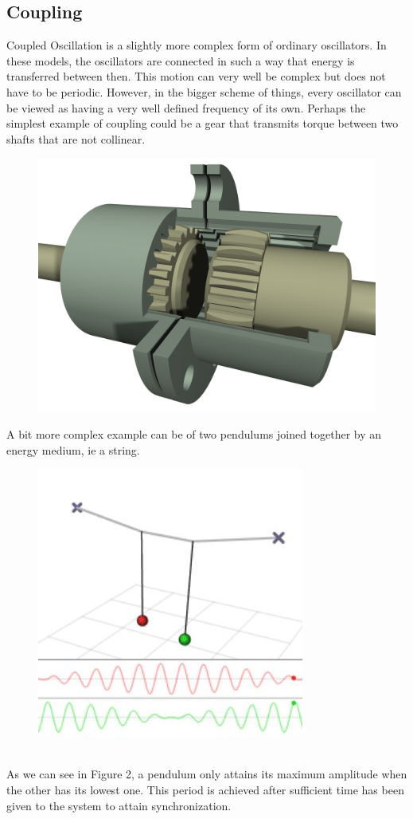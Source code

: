 \subsection{Coupling}
Coupled Oscillation is a slightly more complex form of ordinary oscillators. In these models, the oscillators are connected in such a way that energy is transferred between then. This motion can very well be complex but does not have to be periodic. However, in the bigger scheme of things, every oscillator can be viewed as having a very well defined frequency of its own. Perhaps the simplest example of coupling could be a gear that transmits torque between two shafts that are not collinear. 
\begin{figure}[h!]
  \centering
  \includegraphics[width=0.5\linewidth]{imgs/gear}
  \caption{}
  \label{fig:intro_gear}
\end{figure}
A bit more complex example can be of two pendulums joined together by an energy medium, ie a string.
\begin{figure}[h!]
\centering
\includegraphics[width=0.5\linewidth]{imgs/couple}
\caption{}
\label{fig:intro_couple}
\end{figure}
\\
As we can see in Figure 2, a pendulum only attains its maximum amplitude when the other has its lowest one. This period is achieved after sufficient time has been given to the system to attain synchronization.  

